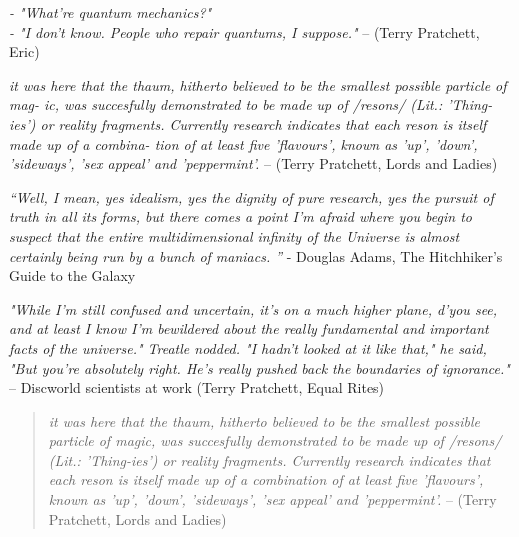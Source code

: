 \emph{ - "What're quantum mechanics?" \\ 
- "I don't know. People who repair quantums, I suppose." }
-- (Terry Pratchett, Eric)



\emph{it was here that the thaum, hitherto believed to be the smallest possible particle of mag-
ic, was succesfully demonstrated to be made up of /resons/ (Lit.: 'Thing-ies') or reality
fragments. Currently research indicates that each reson is itself made up of a combina-
tion of at least five 'flavours', known as 'up', 'down', 'sideways', 'sex appeal' and
'peppermint'.}
-- (Terry Pratchett, Lords and Ladies)


\emph{“Well, I mean, yes idealism, yes the dignity of pure research, yes the pursuit of truth in all its forms, 
but there comes a point I'm afraid where you begin to suspect that the entire multidimensional infinity of 
the Universe is almost certainly being run by a bunch of maniacs. 
” }
- Douglas Adams, The Hitchhiker's Guide to the Galaxy

\emph{"While I'm still confused and uncertain, it's on a much higher plane, d'you see, and at
least I know I'm bewildered about the really fundamental and important facts of the
universe."
Treatle nodded. "I hadn't looked at it like that," he said, "But you're absolutely right. He's
really pushed back the boundaries of ignorance."}
-- Discworld scientists at work
(Terry Pratchett, Equal Rites)

\begin{quotation}
\emph{it was here that the thaum, hitherto believed to be the smallest possible particle of 
magic, was succesfully demonstrated to be made up of /resons/ (Lit.: 'Thing-ies') or reality
fragments. Currently research indicates that each reson is itself made up of a combination
 of at least five 'flavours', known as 'up', 'down', 'sideways', 'sex appeal' and
'peppermint'.}
-- (Terry Pratchett, Lords and Ladies)
\end{quotation}


